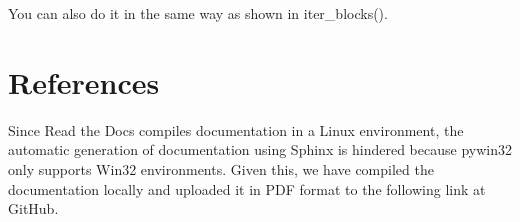 \documentclass[a4paper,10pt,english]{sphinxmanual}
\begin{document}
\sphinxAtStartPar
You can also do it in the same way as shown in iter\_blocks().

\sphinxstepscope


\chapter{References}
\label{\detokenize{API:references}}\label{\detokenize{API::doc}}
\sphinxAtStartPar
Since Read the Docs compiles documentation in a Linux environment, the automatic generation of documentation using
Sphinx is hindered because pywin32 only supports Win32 environments. Given this, we have compiled the documentation
locally and uploaded it in PDF format to the following link at GitHub.

\sphinxAtStartPar
{}
\label{\detokenize{API:module-pyacad.Autocad}}
\end{document}
